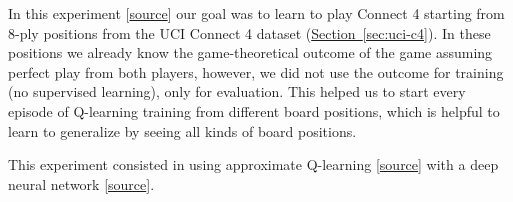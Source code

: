 \documentclass{article}
\newcommand{\GithubURL}[1]{[\href{https://github.com/davidrobles/mlnd-capstone-code/blob/master/#1}{source}]}
\begin{document}
In this experiment \GithubURL{experiments/c4_dvn_uci.py} our goal was to learn to play Connect 4
starting from 8-ply positions from the UCI Connect 4 dataset (\hyperref[sec:uci-c4]
{Section~\ref*{sec:uci-c4}}). In these positions we already know the game-theoretical outcome of the
game assuming perfect play from both players, however, we did not use the outcome for training (no
supervised learning), only for evaluation. This helped us to start every episode of Q-learning
training from different board positions, which is helpful to learn to generalize by seeing all kinds
of board positions.

This experiment consisted in using approximate Q-learning
\GithubURL{capstone/rl/learners/qlearning_approx.py} with a deep neural network
\GithubURL{capstone/rl/value_functions/c4deepnetwork.py}.















\end{document}
